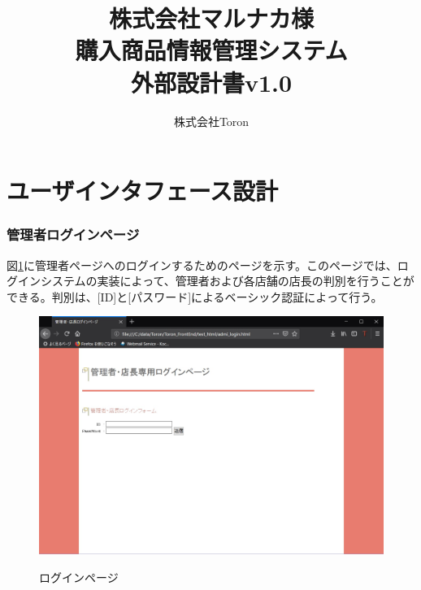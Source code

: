 \documentclass[a4j]{jarticle}
\title{
\vspace{30mm}
株式会社マルナカ様\\
購入商品情報管理システム\\
外部設計書v1.0
\vspace{90mm}
}
\author{
株式会社Toron
}
\begin{document}
\maketitle
\newpage
\tableofcontents
\newpage

\section{ユーザインタフェース設計}


\subsubsection{管理者ログインページ}

図\ref{login}に管理者ページへのログインするためのページを示す。このページでは、ログインシステムの実装によって、管理者および各店舗の店長の判別を行うことができる。判別は、[ID]と[パスワード]によるベーシック認証によって行う。
\begin{figure}[H]
  \begin{center}
    \includegraphics[width=15cm]{login.jpg} \\
    \caption{ログインページ}
    \label{login}
  \end{center}
\end{figure}
\end{document}
